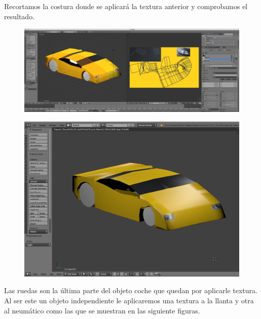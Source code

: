 \documentclass[10pt]{article}
\begin{document}
Recortamos la costura donde se aplicará la textura anterior y comprobamos el resultado. \\

\begin{figure}[H]
	\begin{center}
	 		\includegraphics[width = 1.00\textwidth]{Imagenes/p3-img18}
	\end{center} 
\end{figure}

\begin{figure}[H]
	\begin{center}
	 		\includegraphics[width = 1.00\textwidth]{Imagenes/p3-img19}
	\end{center} 
\end{figure}

Las ruedas son la última parte del objeto coche que quedan por aplicarle textura. Al ser este un objeto independiente le aplicaremos una textura a la llanta y otra al neumático como las que se muestran en las siguiente figuras. \\
\end{document}
